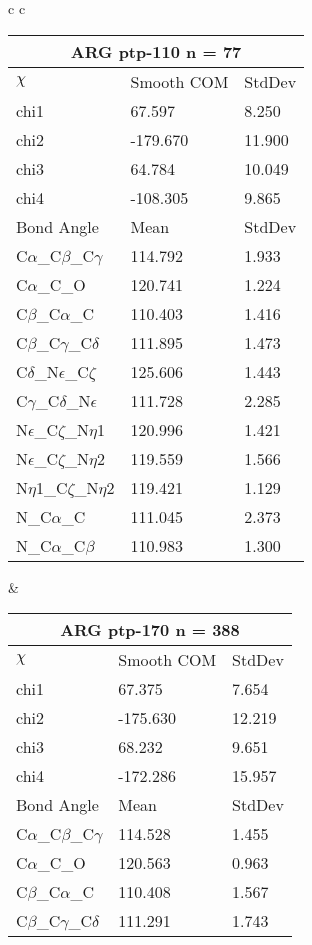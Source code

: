 \begin{longtable}{ c c }
\begin{tabular}{ l l l }
  \toprule
  \multicolumn{3}{c}{ARG \textbf{ptp-110} n = 77} \\ \toprule
  $\chi$       & Smooth COM & StdDev \\ \midrule
  chi1 & 67.597 & 8.250 \\ 
  chi2 & -179.670 & 11.900 \\ 
  chi3 & 64.784 & 10.049 \\ 
  chi4 & -108.305 & 9.865 \\ \midrule
  Bond Angle   & Mean     & StdDev \\ \midrule
  C$\alpha$\_C$\beta$\_C$\gamma$ & 114.792 & 1.933\\
  C$\alpha$\_C\_O & 120.741 & 1.224\\
  C$\beta$\_C$\alpha$\_C & 110.403 & 1.416\\
  C$\beta$\_C$\gamma$\_C$\delta$ & 111.895 & 1.473\\
  C$\delta$\_N$\epsilon$\_C$\zeta$ & 125.606 & 1.443\\
  C$\gamma$\_C$\delta$\_N$\epsilon$ & 111.728 & 2.285\\
  N$\epsilon$\_C$\zeta$\_N$\eta$1 & 120.996 & 1.421\\
  N$\epsilon$\_C$\zeta$\_N$\eta$2 & 119.559 & 1.566\\
  N$\eta$1\_C$\zeta$\_N$\eta$2 & 119.421 & 1.129\\
  N\_C$\alpha$\_C & 111.045 & 2.373\\
  N\_C$\alpha$\_C$\beta$ & 110.983 & 1.300\\
  \bottomrule
  \end{tabular}
  &
  \begin{tabular}{ l l l }
  \toprule
  \multicolumn{3}{c}{ARG \textbf{ptp-170} n = 388} \\ \toprule
  $\chi$       & Smooth COM & StdDev \\ \midrule
  chi1 & 67.375 & 7.654 \\ 
  chi2 & -175.630 & 12.219 \\ 
  chi3 & 68.232 & 9.651 \\ 
  chi4 & -172.286 & 15.957 \\ \midrule
  Bond Angle   & Mean     & StdDev \\ \midrule
  C$\alpha$\_C$\beta$\_C$\gamma$ & 114.528 & 1.455\\
  C$\alpha$\_C\_O & 120.563 & 0.963\\
  C$\beta$\_C$\alpha$\_C & 110.408 & 1.567\\
  C$\beta$\_C$\gamma$\_C$\delta$ & 111.291 & 1.743\\

\end{tabular}
\end{longtable}
